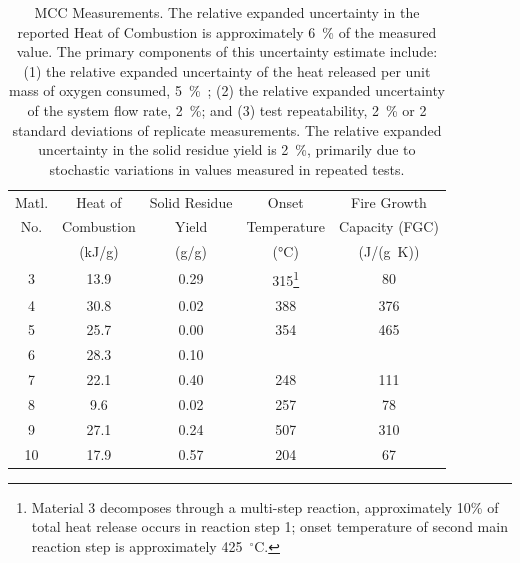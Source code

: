 \begin{table}
\caption[MCC Measurements]{MCC Measurements. The relative expanded uncertainty in the reported Heat of Combustion is approximately 6~\% of the measured value. The primary components of this uncertainty estimate include: (1) the relative expanded uncertainty of the heat released per unit mass of oxygen consumed, 5~\%~\cite{Huggett:1}; (2) the relative expanded uncertainty of the system flow rate, 2~\%; and (3) test repeatability, 2~\% or 2 standard deviations of replicate measurements. The relative expanded uncertainty in the solid residue yield is 2~\%, primarily due to stochastic variations in values measured in repeated tests.}
\label{MCC}
\begin{minipage}{\textwidth}
\begin{tabular}{ccccc}
\hline
Matl.  & Heat of        & Solid Residue    & Onset              & Fire Growth             \\
No.    & Combustion     & Yield            & Temperature        & Capacity (FGC)          \\
       & (kJ/g)         & (g/g)            & (°C)               & (J/(g~K))               \\ \hline
3      &  13.9          & 0.29             & 315\footnote{Material 3 decomposes through a multi-step reaction, approximately 10\% of total heat release occurs in reaction step 1; onset temperature of second main reaction step is approximately 425~$^\circ$C.}     & 80             \\
4      &  30.8          & 0.02             & 388                & 376                     \\
5      &  25.7          & 0.00             & 354                & 465         \\
6      &  28.3          & 0.10             &                    &              \\
7      &  22.1          & 0.40             & 248                & 111            \\
8      &   9.6          & 0.02             & 257                &  78           \\
9      &  27.1          & 0.24             & 507                & 310             \\
10     &  17.9          & 0.57             & 204                &  67            \\
\hline
\end{tabular}
\end{minipage}
\end{table}



